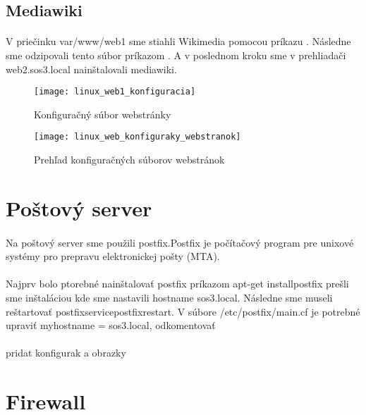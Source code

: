\subsection{Mediawiki}
\paragraph{}
V priečinku var/www/web1 sme stiahli Wikimedia pomocou príkazu  . Následne sme odzipovali tento súbor príkazom  . A v poslednom kroku sme v prehliadači web2.sos3.local nainštalovali mediawiki.

\begin{figure}[!htb]
\centering
\texttt{[image: linux\_web1\_konfiguracia]}
\caption{Konfiguračný súbor webstránky}
\label{fig:x web1_config_file}
\end{figure}

\begin{figure}[!htb]
\centering
\texttt{[image: linux\_web\_konfiguraky\_webstranok]}
\caption{Prehľad konfiguračných súborov webstránok}
\label{fig:x web_config_files_list}
\end{figure}

\section{Poštový server}
\paragraph{}
Na poštový server sme použili postfix.Postfix je počítačový program pre unixové systémy pro prepravu elektronickej pošty (MTA).
\paragraph{}
Najprv bolo ptorebné nainštalovať postfix príkazom apt-get installpostfix prešli sme inštaláciou kde sme nastavili hostname sos3.local. Následne sme museli reštartovať postfixservicepostfixrestart. V súbore /etc/postfix/main.cf je potrebné upraviť myhostname = sos3.local, odkomentovať\\
\paragraph{}
pridat konfigurak a obrazky

\section{Firewall}
